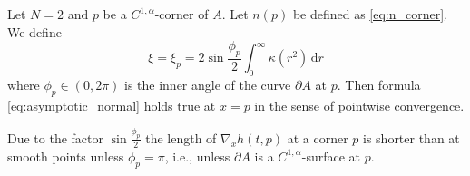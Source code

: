 \documentclass[graybox]{svmult}
\newcommand{\ep}{\varepsilon}
\renewcommand{\d}{\mathrm{d}}  %
\newcommand{\R}{\mathbb{R}}  %
\renewcommand{\AA}{A}  %
\newcommand{\pp}{p}
\begin{document}



\begin{proposition}\label{Thm:piecewise} 
Let $N=2$ and $\pp$ be a $C^{1,\alpha}$-corner of $\AA$. Let $n(\pp)$ be defined as \eqref{eq:n_corner}. We define
$$
\xi = \xi_\pp = 2\sin \frac{\phi_\pp}{2} \int_0^\infty \kappa(r^2)\,\d r
$$
 where $\phi_p\in (0,2\pi)$ is the inner angle of the curve $\partial \AA$ at $\pp$. Then formula \eqref{eq:asymptotic_normal} holds true at $x=\pp$ in the sense of pointwise convergence. 
 
 \end{proposition}
 \begin{remark}
Due to the factor $\sin \frac{\phi_\pp}{2}$ the length of $\nabla_x h(t,\pp)$ at a corner $\pp$ is shorter than at smooth points unless $\phi_p = \pi$, i.e., unless $\partial \AA$ is a $C^{1,\alpha}$-surface at $\pp$.  
 \end{remark}
\end{document}
